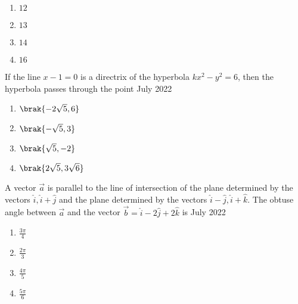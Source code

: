         \begin{multicols}{4}
        \begin{enumerate}
        \item $12$
        \item $13$
        \item $14$
        \item $16$
        \end{enumerate}
        \end{multicols}

    \item If the line $x - 1 = 0$ is a directrix of the hyperbola $kx^{2} - y^{2} = 6$, then the hyperbola passes through the point \hfill{July 2022}

        \begin{multicols}{4}
        \begin{enumerate}
        \item $\brak{-2\sqrt{5}, 6}$
        \item $\brak{-\sqrt{5}, 3}$
        \item $\brak{\sqrt{5}, -2}$
        \item $\brak{2\sqrt{5}, 3\sqrt{6}}$
        \end{enumerate}
        \end{multicols}
        

    \item A vector $\vec{a}$ is parallel to the line of intersection of the plane determined by the vectors $\hat{i}, \hat{i} + \hat{j}$ and the plane determined by the vectors $\hat{i} - \hat{j}, \hat{i} + \hat{k}$. The obtuse angle between $\vec{a}$ and the vector $\vec{b} = \hat{i} - 2\hat{j} + 2\hat{k}$ is \hfill{July 2022}

        \begin{multicols}{4}
        \begin{enumerate}
        \item $\frac{3\pi}{4}$
        \item $\frac{2\pi}{3}$
        \item $\frac{4\pi}{5}$
        \item $\frac{5\pi}{6}$
        \end{enumerate}
        \end{multicols}

    

